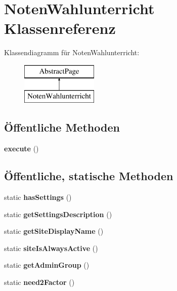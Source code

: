 \hypertarget{class_noten_wahlunterricht}{}\section{Noten\+Wahlunterricht Klassenreferenz}
\label{class_noten_wahlunterricht}
Klassendiagramm für Noten\+Wahlunterricht\+:\begin{figure}[H]
\begin{center}
\leavevmode
\includegraphics[height=2.000000cm]{class_noten_wahlunterricht}
\end{center}
\end{figure}
\subsection*{Öffentliche Methoden}
\begin{DoxyCompactItemize}
\item 
\mbox{\label{class_noten_wahlunterricht_a79f140758ec0b19474b04857555483a7}} 
{\bfseries execute} ()
\end{DoxyCompactItemize}
\subsection*{Öffentliche, statische Methoden}
\begin{DoxyCompactItemize}
\item 
\mbox{\label{class_noten_wahlunterricht_afadfca6fd03e1db6ffd662664050ed23}} 
static {\bfseries has\+Settings} ()
\item 
\mbox{\label{class_noten_wahlunterricht_ab3e8ba84b5324f30e7177ac51f381c4e}} 
static {\bfseries get\+Settings\+Description} ()
\item 
\mbox{\label{class_noten_wahlunterricht_a87058457c2f056ed7241baaf8e459b8b}} 
static {\bfseries get\+Site\+Display\+Name} ()
\item 
\mbox{\label{class_noten_wahlunterricht_a24d8dff2ca9964287cd18ec46211866f}} 
static {\bfseries site\+Is\+Always\+Active} ()
\item 
\mbox{\label{class_noten_wahlunterricht_afc2a849fccb7dbbe91fb0b36531512b6}} 
static {\bfseries get\+Admin\+Group} ()
\item 
\mbox{\label{class_noten_wahlunterricht_ac43cdeff8535fbcc6768b391d218ce2f}} 
static {\bfseries need2\+Factor} ()
\end{DoxyCompactItemize}
